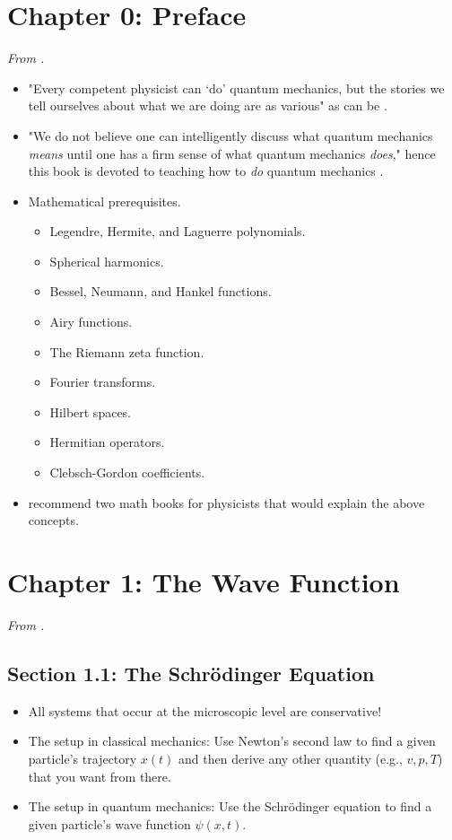\documentclass[../notes.tex]{subfiles}
\begin{document}
\section{Chapter 0: Preface}
\emph{From \textcite{bib:Griffiths}.}
\begin{itemize}
    \item {}"Every competent physicist can `do' quantum mechanics, but the stories we tell ourselves about what we are doing are as various" as can be \parencite[11]{bib:Griffiths}.
    \item "We do not believe one can intelligently discuss what quantum mechanics \emph{means} until one has a firm sense of what quantum mechanics \emph{does}," hence this book is devoted to teaching how to \emph{do} quantum mechanics \parencite[11]{bib:Griffiths}.
    \item Mathematical prerequisites.
    \begin{itemize}
        \item Legendre, Hermite, and Laguerre polynomials.
        \item Spherical harmonics.
        \item Bessel, Neumann, and Hankel functions.
        \item Airy functions.
        \item The Riemann zeta function.
        \item Fourier transforms.
        \item Hilbert spaces.
        \item Hermitian operators.
        \item Clebsch-Gordon coefficients.
    \end{itemize}
    \item \textcite{bib:Griffiths} recommend two math books for physicists that would explain the above concepts.
\end{itemize}



\section{Chapter 1: The Wave Function}
\emph{From \textcite{bib:Griffiths}.}
\subsection*{Section 1.1: The Schr\"{o}dinger Equation}
\begin{itemize}
    \item All systems that occur at the microscopic level are conservative!
    \item The setup in classical mechanics: Use Newton's second law to find a given particle's trajectory $x(t)$ and then derive any other quantity (e.g., $v,p,T$) that you want from there.
    \item The setup in quantum mechanics: Use the Schr\"{o}dinger equation to find a given particle's wave function $\psi(x,t)$.
\end{itemize}
\end{document}
